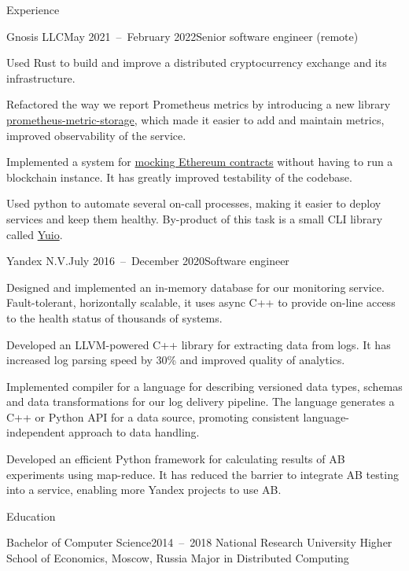 \documentclass{resume}
\begin{document}
    \begin{rSection}{Experience}
        \begin{rSubsection}{Gnosis LLC}{May 2021~--~February 2022}{Senior software engineer (remote)}{}
            \item
                Used Rust to build and improve
                a distributed cryptocurrency exchange and its infrastructure.
            \item
                Refactored the way we report Prometheus metrics
                by introducing a new library
                \href{https://github.com/taminomara/prometheus-metric-storage}{prometheus-metric-storage}, which made it easier to add and maintain metrics,
                improved observability of the service.
            \item
                Implemented a system for
                \href{https://docs.rs/ethcontract-mock/latest/ethcontract_mock/}{mocking Ethereum contracts}
                without having to run a blockchain instance.
                It has greatly improved testability of the codebase.
            \item
                Used python to automate several on-call processes,
                making it easier to deploy services and keep them healthy.
                By-product of this task is a small CLI library called
                \href{https://github.com/taminomara/yuio}{Yuio}.
        \end{rSubsection}

        \begin{rSubsection}{Yandex N.V.}{July 2016~--~December 2020}{Software engineer}{}
            \item
                Designed and implemented an in-memory database
                for our monitoring service.
                Fault-tolerant, horizontally scalable,
                it uses async C++ to provide on-line access
                to the health status of thousands of systems.
            \item
                Developed an LLVM-powered C++ library
                for extracting data from logs.
                It has increased log parsing speed
                by 30\% and improved quality of analytics.
            \item
                Implemented compiler for a language for describing
                versioned data types, schemas and data transformations
                for our log delivery pipeline. The language
                generates a C++ or Python API for a data source,
                promoting consistent language-independent approach to data handling.
            \item
                Developed an efficient Python framework
                for calculating results of AB experiments using map-reduce.
                It has reduced the barrier
                to integrate AB testing into a service,
                enabling more Yandex projects to use AB\@.
        \end{rSubsection}
    \end{rSection}

    \begin{rSection}{Education}
        \begin{rSubsection}{Bachelor of Computer Science}{2014~--~2018}
        {National Research University Higher School of Economics, Moscow, Russia}{}
            Major in Distributed Computing
        \end{rSubsection}
    \end{rSection}
\end{document}
